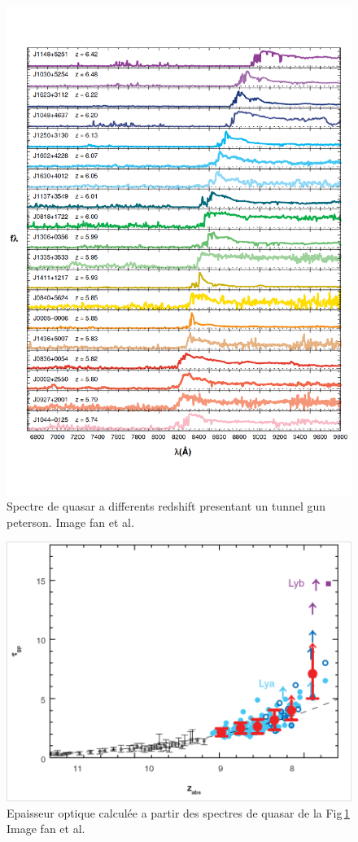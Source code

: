 \begin{figure}[bth]
        \includegraphics[width=.95\linewidth]{img/01/quasar_spectre.pdf} 
        \caption{Spectre de quasar a differents redshift presentant un tunnel gun peterson.
        Image fan et al.}
 		\label{fig:spectre_quasar}
\end{figure}


\begin{figure}[bth]
        \includegraphics[width=.95\linewidth]{img/01/epaisseur_optique_quasar.png} 
        \caption{%
		Epaisseur optique calculée a partir des spectres de quasar de la Fig\,\ref{fig:spectre_quasar}
        Image fan et al.}
 		\label{fig:epaisseur_optique_quasar}
\end{figure}

